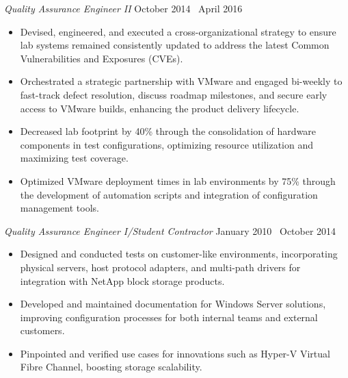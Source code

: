 \documentclass[10pt]{article}       %
\begin{document}
\textit{Quality Assurance Engineer II} \hfill October 2014 \textendash\ April 2016 \\
\vspace{-6.5pt}
\begin{itemize}
  \item Devised, engineered, and executed a cross-organizational strategy to ensure lab systems remained consistently updated to address the latest Common Vulnerabilities and Exposures (CVEs).
  \item Orchestrated a strategic partnership with VMware and engaged bi-weekly to fast-track defect resolution, discuss roadmap milestones, and secure early access to VMware builds, enhancing the product delivery lifecycle.
  \item Decreased lab footprint by 40\% through the consolidation of hardware components in test configurations, optimizing resource utilization and maximizing test coverage.
  \item Optimized VMware deployment times in lab environments by 75\% through the development of automation scripts and integration of configuration management tools.
\end{itemize}

\textit{Quality Assurance Engineer I/Student Contractor} \hfill January 2010 \textendash\ October 2014 \\
\vspace{-6.5pt}
\begin{itemize}
  \item Designed and conducted tests on customer-like environments, incorporating physical servers, host protocol adapters, and multi-path drivers for integration with NetApp block storage products.
  \item Developed and maintained documentation for Windows Server solutions, improving configuration processes for both internal teams and external customers.
  \item Pinpointed and verified use cases for innovations such as Hyper-V Virtual Fibre Channel, boosting storage scalability.
\end{itemize}

\end{document}
